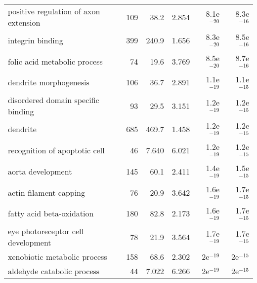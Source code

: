 \begin{longtable}{lrrrrr}
             positive regulation of axon extension &                     109 &                    38.2 &      2.854 &         8.1e$^{-20}$ &         8.3e$^{-16}$ \\
                                  integrin binding &                     399 &                   240.9 &      1.656 &         8.3e$^{-20}$ &         8.5e$^{-16}$ \\
                      folic acid metabolic process &                      74 &                    19.6 &      3.769 &         8.5e$^{-20}$ &         8.7e$^{-16}$ \\
                            dendrite morphogenesis &                     106 &                    36.7 &      2.891 &         1.1e$^{-19}$ &         1.1e$^{-15}$ \\
                disordered domain specific binding &                      93 &                    29.5 &      3.151 &         1.2e$^{-19}$ &         1.2e$^{-15}$ \\
                                          dendrite &                     685 &                   469.7 &      1.458 &         1.2e$^{-19}$ &         1.2e$^{-15}$ \\
                     recognition of apoptotic cell &                      46 &                   7.640 &      6.021 &         1.2e$^{-19}$ &         1.2e$^{-15}$ \\
                                 aorta development &                     145 &                    60.1 &      2.411 &         1.4e$^{-19}$ &         1.5e$^{-15}$ \\
                            actin filament capping &                      76 &                    20.9 &      3.642 &         1.6e$^{-19}$ &         1.7e$^{-15}$ \\
                         fatty acid beta-oxidation &                     180 &                    82.8 &      2.173 &         1.6e$^{-19}$ &         1.7e$^{-15}$ \\
                eye photoreceptor cell development &                      78 &                    21.9 &      3.564 &         1.7e$^{-19}$ &         1.7e$^{-15}$ \\
                      xenobiotic metabolic process &                     158 &                    68.6 &      2.302 &           2e$^{-19}$ &           2e$^{-15}$ \\
                        aldehyde catabolic process &                      44 &                   7.022 &      6.266 &           2e$^{-19}$ &           2e$^{-15}$ \\

\end{longtable}
